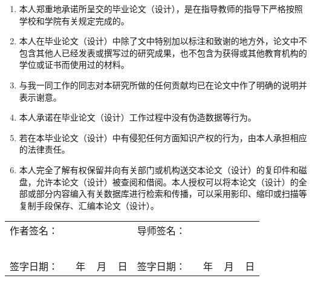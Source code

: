 % 		

{
    \thispagestyle{empty}



    \begin{enumerate}[itemindent=44pt, leftmargin=0pt, itemsep=0pt, parsep=0pt, topsep = 0pt]
        \item 本人郑重地承诺所呈交的毕业论文（设计），是在指导教师的指导下严格按照学校和学院有关规定完成的。
        \item 本人在毕业论文（设计）中除了文中特别加以标注和致谢的地方外，论文中不包含其他人已经发表或撰写过的研究成果，也不包含为获得或其他教育机构的学位或证书而使用过的材料。
        \item 与我一同工作的同志对本研究所做的任何贡献均已在论文中作了明确的说明并表示谢意。
        \item 本人承诺在毕业论文（设计）工作过程中没有伪造数据等行为。
        \item 若在本毕业论文（设计）中有侵犯任何方面知识产权的行为，由本人承担相应的法律责任。
        \item 本人完全了解有权保留并向有关部门或机构送交本论文（设计）的复印件和磁盘，允许本论文（设计）被查阅和借阅。本人授权可以将本论文（设计）的全部或部分内容编入有关数据库进行检索和传播，可以采用影印、缩印或扫描等复制手段保存、汇编本论文（设计）。
    \end{enumerate}

    \mbox{} \vfill
    \begin{center}
        \begin{tabularx}{\linewidth}{
            >{\fangsong}p{}
            >{\fangsong}X
            >{\fangsong}p{}
            >{\fangsong}X
            }
            作者签名： & ~                    & 导师签名： & ~\\
            ~     & ~                                   & ~     & ~                                   \\
            签字日期： & ~ 年 ~ 月 ~ 日 & 签字日期： & ~ 年 ~ 月 ~ 日 \\
        \end{tabularx}
    \end{center}
}
